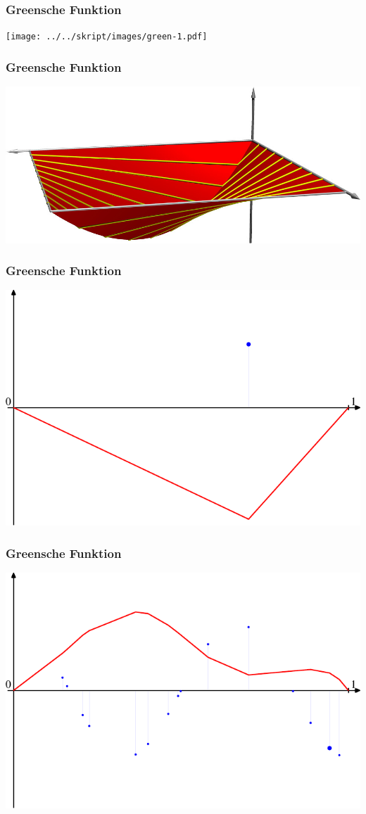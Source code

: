 \documentclass{beamer}
\begin{document}
\begin{frame}
\frametitle{Greensche Funktion}
\texttt{[image: ../../skript/images/green-1.pdf]}
\end{frame}

\begin{frame}
\frametitle{Greensche Funktion}
\includegraphics[width=\hsize]{../../skript/3d/green.jpg}
\end{frame}

\begin{frame}
\frametitle{Greensche Funktion}
\includegraphics[width=\hsize]{../../skript/graphics/green-1.pdf}
\end{frame}

\begin{frame}
\frametitle{Greensche Funktion}
\includegraphics[width=\hsize]{../../skript/graphics/green-324.pdf}
\end{frame}
\end{document}
